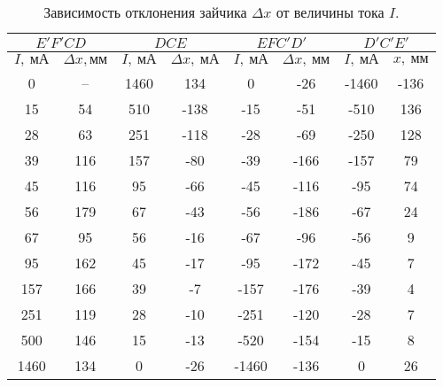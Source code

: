 \renewcommand{\arraystretch}{1} 
\begin{table}[H]
\centering
\begin{tabular}{|c|c|c|c|c|c|c|c|}
\hline
\multicolumn{2}{|c|}{$E'F'CD$} &
\multicolumn{2}{c|}{$DCE$} &
\multicolumn{2}{c|}{$EFC'D'$} &
\multicolumn{2}{c|}{$D'C'E'$} \\ \hline
$I, \ \text{мА}$            &
$\Delta x, \text {мм}$           &$I, \
\text{мА}$ 
             & $\Delta x, \
\text{мА}$          &$I, \ \text{мА}$ 
             & $\Delta x, \
\text{мм}$          &$I, \ \text{мА}$ 
             & $x, \ \text{мм}$           \\ \hline
0    &  --   & 1460 & 134  & 0     & -26  & -1460  & -136 \\ \hline
15   & 54  & 510  & -138 & -15   & -51  & -510   & 136  \\ \hline
28   & 63  & 251  & -118 & -28   & -69  & -250   & 128  \\ \hline
39   & 116 & 157  & -80  & -39   & -166 & -157   & 79   \\ \hline
45   & 116 & 95   & -66  & -45   & -116 & -95    & 74   \\ \hline
56   & 179 & 67   & -43  & -56   & -186 & -67    & 24   \\ \hline
67   & 95  & 56   & -16  & -67   & -96  & -56    & 9    \\ \hline
95   & 162 & 45   & -17  & -95   & -172 & -45    & 7    \\ \hline
157  & 166 & 39   & -7   & -157  & -176 & -39    & 4    \\ \hline
251  & 119 & 28   & -10  & -251  & -120 & -28    & 7    \\ \hline
500  & 146 & 15   & -13  & -520  & -154 & -15    & 8    \\ \hline
1460 & 134 & 0    & -26  & -1460 & -136
     & 0      & 26  \\  \hline
\end{tabular}
\captionsetup{justification=centering}
\caption{
Зависимость отклонения зайчика
$\Delta x$
от величины тока $I$.
}
\end{table}

